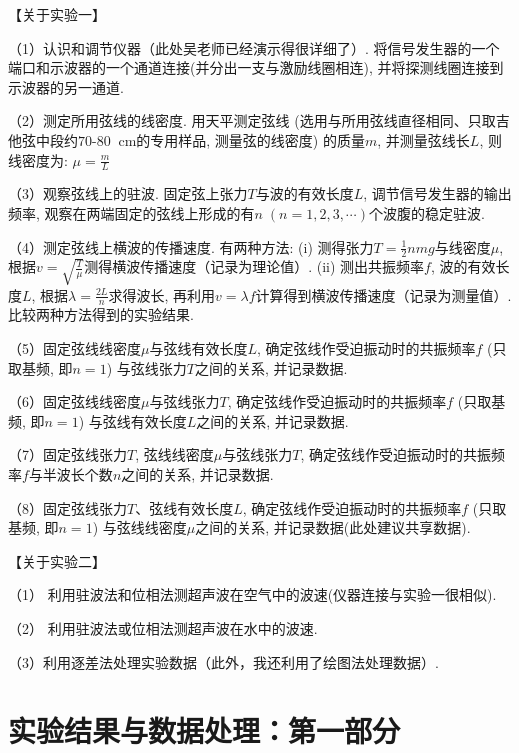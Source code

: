 \documentclass[11pt]{article}
\newcommand*{\unit}[1]{\mathop{}\!\mathrm{#1}}
\begin{document}
\bigskip
\noindent 【关于实验一】

（1）认识和调节仪器（此处吴老师已经演示得很详细了）. 将信号发生器的一个端口和示波器的一个通道连接(并分出一支与激励线圈相连), 并将探测线圈连接到示波器的另一通道. 
    
（2）测定所用弦线的线密度. 用天平测定弦线 (选用与所用弦线直径相同、只取吉他弦中段约$70$-$80 \unit{cm}$的专用样品, 测量弦的线密度) 的质量$m$, 并测量弦线长$L$, 则线密度为: $\mu=\frac mL$
	
（3）观察弦线上的驻波. 固定弦上张力$T$与波的有效长度$L$, 调节信号发生器的输出频率, 观察在两端固定的弦线上形成的有$n\; (n=1,2,3,\cdots)$个波腹的稳定驻波. 
	
（4）测定弦线上横波的传播速度. 有两种方法:
 (i) 测得张力$T = \frac{1}{2}nmg$与线密度$\mu$, 
 根据$v=\sqrt{\frac T\mu}$测得横波传播速度（记录为理论值）. 
 (ii) 测出共振频率$f$, 波的有效长度$L$, 根据$\lambda=\frac{2L}{n}$求得波长, 
 再利用$v=\lambda f$计算得到横波传播速度（记录为测量值）. 比较两种方法得到的实验结果. 
	
（5）固定弦线线密度$\mu$与弦线有效长度$L$, 确定弦线作受迫振动时的共振频率$f$ (只取基频, 即$n=1$) 与弦线张力$T$之间的关系, 并记录数据. 
	
（6）固定弦线线密度$\mu$与弦线张力$T$, 确定弦线作受迫振动时的共振频率$f$ (只取基频, 即$n=1$) 与弦线有效长度$L$之间的关系, 并记录数据. 
	
（7）固定弦线张力$T$, 弦线线密度$\mu$与弦线张力$T$, 确定弦线作受迫振动时的共振频率$f$与半波长个数$n$之间的关系, 并记录数据. 
	
（8）固定弦线张力$T$、弦线有效长度$L$, 确定弦线作受迫振动时的共振频率$f$ (只取基频, 即$n=1$) 与弦线线密度$\mu$之间的关系, 并记录数据(此处建议共享数据). 

\bigskip

\noindent【关于实验二】

（1） 利用驻波法和位相法测超声波在空气中的波速(仪器连接与实验一很相似).

 （2） 利用驻波法或位相法测超声波在水中的波速. 

（3）利用逐差法处理实验数据（此外，我还利用了绘图法处理数据）. 


















\section{实验结果与数据处理：第一部分}
\end{document}
